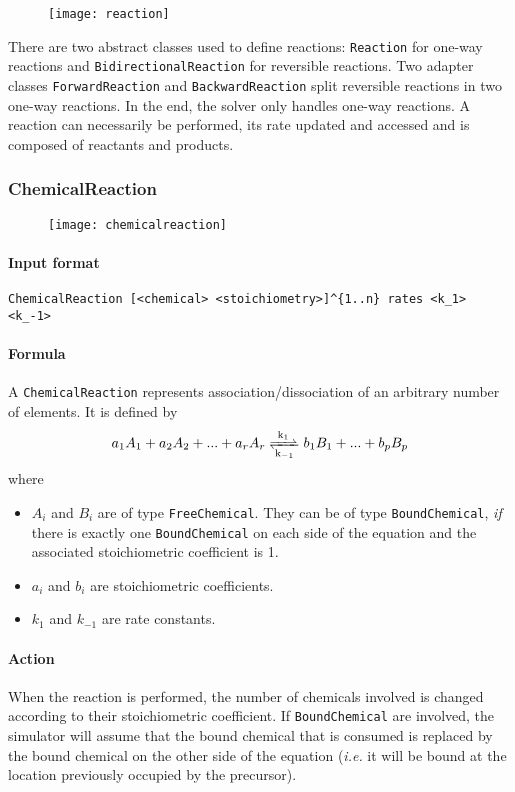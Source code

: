 \begin{figure}[!ht]
	\centering
	\texttt{[image: reaction]}
\end{figure}

There are two abstract classes used to define reactions: \texttt{Reaction} for one-way reactions and \texttt{BidirectionalReaction} for reversible reactions. Two adapter classes \texttt{ForwardReaction} and \texttt{BackwardReaction} split reversible reactions in two one-way reactions. In the end, the solver only handles one-way reactions. A reaction can necessarily be performed, its rate updated and accessed and is composed of reactants and products.

\subsubsection{ChemicalReaction}

\begin{figure}[!ht]
	\centering
	\texttt{[image: chemicalreaction]}
\end{figure}

\paragraph{Input format}
\begin{verbatim}
ChemicalReaction [<chemical> <stoichiometry>]^{1..n} rates <k_1> <k_-1>
\end{verbatim}

\paragraph{Formula} A \texttt{ChemicalReaction} represents association/dissociation of an arbitrary number of elements. It is defined by
$$
	\reactionRev{a_1 A_1 + a_2 A_2 + ... + a_r A_r}{b_1 B_1 + ... + b_p B_p}{k_1}{k_{-1}}
$$
where
\begin{itemize}
	\item $A_i$ and $B_i$ are of type \texttt{FreeChemical}. They can be of type \texttt{BoundChemical}, \emph{if} there is exactly one \texttt{BoundChemical} on each side of the equation and the associated stoichiometric coefficient is 1. 
	\item $a_i$ and $b_i$ are stoichiometric coefficients.
	\item $k_1$ and $k_{-1}$ are rate constants.
\end{itemize}

\paragraph{Action} When the reaction is performed, the number of chemicals involved is changed according to their stoichiometric coefficient. If \texttt{BoundChemical} are involved, the simulator will assume that the bound chemical that is consumed is replaced by the bound chemical on the other side of the equation (\textit{i.e.} it will be bound at the location previously occupied by the precursor).

